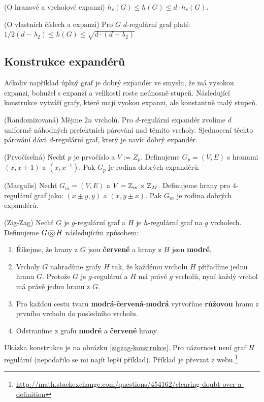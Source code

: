 \poz (O hranové a vrcholové expanzi) $h_v(G) \leq h(G) \leq d \cdot h_v(G)$.

\vt (O vlastních číslech a expanzi) Pro $G$ $d$-regulární graf platí: $1/2(d -
\lambda_2) \leq h(G) \leq \sqrt{d \cdot (d - \lambda_2)}$

\subsection{Konstrukce expandérů}

Ačkoliv například úplný graf je dobrý expandér ve smyslu, že má vysokou
expanzi, bohužel s expanzí a velikostí roste neúnosně stupeň. Následující
konstrukce vytváří grafy, které mají vyokou expanzi, ale konstantně malý
stupeň.

\vt (Randomizovaná) Mějme $2n$ vrcholů. Pro $d$-regulární expandér zvolíme $d$
uniformě náhodných prefektních párování nad těmito vrcholy. Sjednocení těchto
párování dává $d$-regulární graf, který je navíc dobrý expandér.

\vt (Prvočíselná) Nechť $p$ je prvočíslo a $V:=Z_p$. Definujeme $G_p=(V,E)$ s
hranami $(x, x\pm 1)$ a $(x,x^{-1})$. Pak $G_p$ je rodina dobrých expandérů.

\vt (Margulis) Nechť $G_m=(V,E)$ a $V=\mathbb{Z}_m \times \mathbb{Z}_M$. Definujeme hrany pro
$4$-regulární graf jako: $(x\pm y, y)$ a $(x,y\pm x)$. Pak $G_m$ je rodina
dobrých expandérů.

\df (Zig-Zag) Nechť $G$ je $g$-regulární graf a $H$ je $h$-regulární graf na $g$
vrcholech. Definujeme $G \zz H$ následujícím způsobem:
\begin{enumerate}
	\item Říkejme, že hrany z $G$ jsou {\bf\color{red}červené} a hrany z $H$
		jsou {\bf\color{blue}modré}.
	\item Vrcholy $G$ nahradíme grafy $H$ tak, že každému vrcholu $H$ přiřadíme
	jednu hranu $G$. Protože $G$ je $g$-regulární a $H$ má právě $g$ vrcholů,
	nyní každý vrchol má právě jednu hranu z $G$.
	\item Pro každou cestu tvaru
		{\bf\color{blue}modrá}-{\bf\color{red}červená}-{\bf\color{blue}modrá}
		vytvoříme {\bf\color{magenta}růžovou} hranu z prvního vrcholu do
		posledního vrcholu.
	\item Odstraníme z grafu {\bf\color{blue}modré} a {\bf\color{red}červené}
		hrany.
\end{enumerate}
Ukázka konstrukce je na obrázku \ref{zigzag-konstrukce}. Pro názornost není
graf $H$ regulární (nepodařilo se mi najít lepší příklad). Příklad je převzat z
webu.\footnote{\url{http://math.stackexchange.com/questions/454162/clearing-doubt-over-a-definition}}

